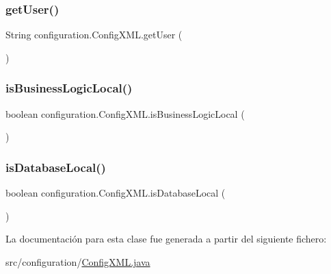 \subsubsection{\texorpdfstring{getUser()}{getUser()}}
{\footnotesize\ttfamily String configuration.\+Config\+X\+M\+L.\+get\+User (\begin{DoxyParamCaption}{ }\end{DoxyParamCaption})}

\mbox{\label{classconfiguration_1_1_config_x_m_l_a3055cd4f61151ef6d1c48a5ebf86b33f}} 
\subsubsection{\texorpdfstring{isBusinessLogicLocal()}{isBusinessLogicLocal()}}
{\footnotesize\ttfamily boolean configuration.\+Config\+X\+M\+L.\+is\+Business\+Logic\+Local (\begin{DoxyParamCaption}{ }\end{DoxyParamCaption})}

\mbox{\label{classconfiguration_1_1_config_x_m_l_a2ee9afbde36aa3f5c0d0158a8b5449fb}} 
\subsubsection{\texorpdfstring{isDatabaseLocal()}{isDatabaseLocal()}}
{\footnotesize\ttfamily boolean configuration.\+Config\+X\+M\+L.\+is\+Database\+Local (\begin{DoxyParamCaption}{ }\end{DoxyParamCaption})}



La documentación para esta clase fue generada a partir del siguiente fichero\+:\begin{DoxyCompactItemize}
\item 
src/configuration/\mbox{\hyperlink{_config_x_m_l_8java}{Config\+X\+M\+L.\+java}}\end{DoxyCompactItemize}
